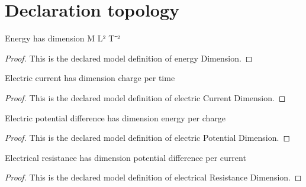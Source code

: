 \section{Declaration topology}
\begin{definition}
  \label{def:physics:phyx-mini-0881:phyxminiproblems-problemphyxmini0881-energydimension}
  Energy has dimension M L² T⁻²
\end{definition}
\begin{proof}
  This is the declared model definition of energy Dimension.
\end{proof}
\begin{definition}
  \label{def:physics:phyx-mini-0881:phyxminiproblems-problemphyxmini0881-electriccurrentdimension}
  Electric current has dimension charge per time
\end{definition}
\begin{proof}
  This is the declared model definition of electric Current Dimension.
\end{proof}
\begin{definition}
  \label{def:physics:phyx-mini-0881:phyxminiproblems-problemphyxmini0881-electricpotentialdimension}
  Electric potential difference has dimension energy per charge
\end{definition}
\begin{proof}
  This is the declared model definition of electric Potential Dimension.
\end{proof}
\begin{definition}
  \label{def:physics:phyx-mini-0881:phyxminiproblems-problemphyxmini0881-electricalresistancedimension}
  Electrical resistance has dimension potential difference per current
\end{definition}
\begin{proof}
  This is the declared model definition of electrical Resistance Dimension.
\end{proof}
